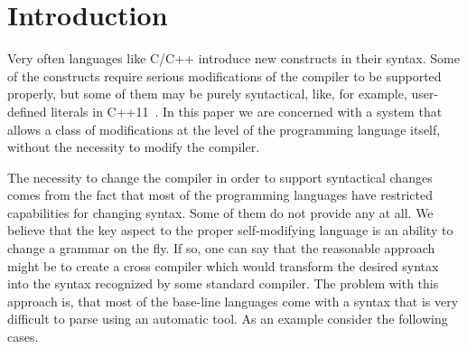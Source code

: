 \section{\label{sec:intro}Introduction}

Very often languages like C/C++ introduce new constructs in their
syntax.  Some of the constructs require serious modifications of the
compiler to be supported properly, but some of them may be purely syntactical,
like, for example, user-defined literals in C++11~\cite{cpp11}.  In this 
paper we are
concerned with a system that allows a class of modifications at the 
level of the programming language itself, without the necessity to
modify the compiler.

The necessity to change the compiler in order to support syntactical 
changes comes from the fact that most of the programming languages 
have restricted capabilities for changing syntax.  Some of them do not
provide any at all.  We believe that the key
aspect to the proper self-modifying language is an ability to 
change a grammar on the fly.  If so, one can say that the
reasonable approach might be to create a cross compiler which
would transform the desired syntax into the syntax recognized by
some standard compiler.  The problem with this approach is, that most of
the base-line languages come with a syntax that is very difficult
to parse using an automatic tool.  As an example consider the 
following cases.



